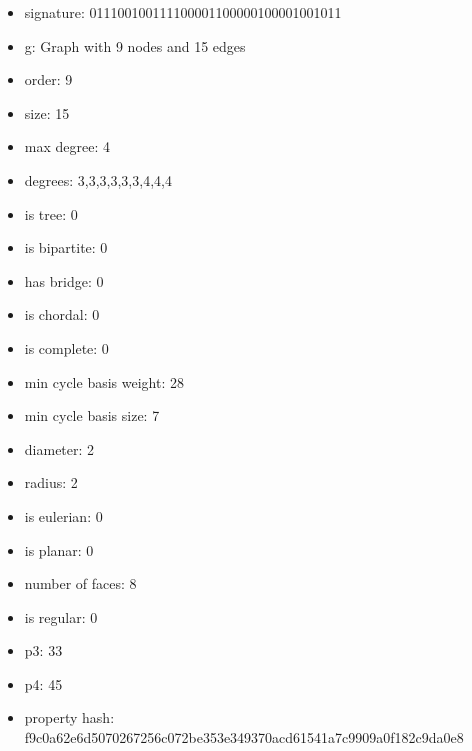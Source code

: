 \newpage
\begin{figure}
\end{figure}
\begin{itemize}
\item signature: 011100100111100001100000100001001011
\item g: Graph with 9 nodes and 15 edges
\item order: 9
\item size: 15
\item max degree: 4
\item degrees: 3,3,3,3,3,3,4,4,4
\item is tree: 0
\item is bipartite: 0
\item has bridge: 0
\item is chordal: 0
\item is complete: 0
\item min cycle basis weight: 28
\item min cycle basis size: 7
\item diameter: 2
\item radius: 2
\item is eulerian: 0
\item is planar: 0
\item number of faces: 8
\item is regular: 0
\item p3: 33
\item p4: 45
\item property hash: f9c0a62e6d5070267256c072be353e349370acd61541a7c9909a0f182c9da0e8
\end{itemize}
\newpage
